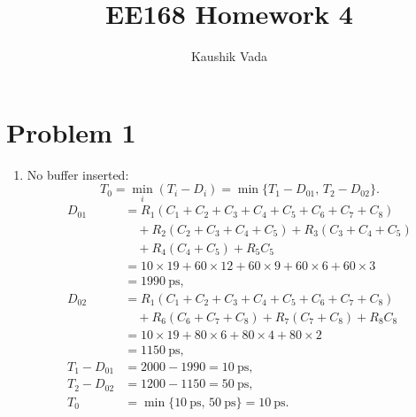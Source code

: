 \documentclass[11pt]{article}
\title{EE168 Homework 4}
\author{Kaushik Vada}
\date{}
\begin{document}
\maketitle

\section*{Problem 1}
\begin{enumerate}[label=(\alph*)]
  \item No buffer inserted:
  \[
    T_0 = \min_i (T_i - D_i) = \min\{T_1 - D_{01},\, T_2 - D_{02}\}.
  \]
  \begin{align*}
    D_{01} &= R_1(C_1 + C_2 + C_3 + C_4 + C_5 + C_6 + C_7 + C_8) \\
           &\quad {}+ R_2(C_2 + C_3 + C_4 + C_5) + R_3(C_3 + C_4 + C_5) \\
           &\quad {}+ R_4(C_4 + C_5) + R_5 C_5 \\
           &= 10\times 19 + 60\times 12 + 60\times 9 + 60\times 6 + 60\times 3 \\
           &= 1990~\text{ps}, \\
    D_{02} &= R_1(C_1 + C_2 + C_3 + C_4 + C_5 + C_6 + C_7 + C_8) \\
           &\quad {}+ R_6(C_6 + C_7 + C_8) + R_7(C_7 + C_8) + R_8 C_8 \\
           &= 10\times 19 + 80\times 6 + 80\times 4 + 80\times 2 \\
           &= 1150~\text{ps}, \\
    T_1 - D_{01} &= 2000 - 1990 = 10~\text{ps}, \\
    T_2 - D_{02} &= 1200 - 1150 = 50~\text{ps}, \\
    T_0 &= \min\{10~\text{ps},\, 50~\text{ps}\} = 10~\text{ps}.
  \end{align*}


\end{enumerate}
\end{document}

